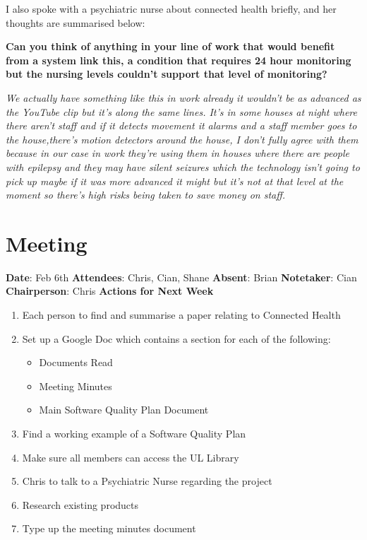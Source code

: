 I also spoke with a psychiatric nurse about connected health briefly, and her thoughts are summarised below: 

\textbf{Can you think of anything in your line of work that would benefit from a system link this, a condition that requires 24 hour monitoring but the nursing levels couldn't support that level of monitoring?}

\textit{We actually have something like this in work already it wouldn't be as advanced as the YouTube clip but it's along the same lines. It's in some houses at night where there aren't staff and if it detects movement it alarms and a staff member goes to the house,there's motion detectors around the house, I don't fully agree with them because in our case in work they're using them in houses where there are people with epilepsy and they may have silent seizures which the technology isn't going to pick up maybe if it was more advanced it might but it's not at that level at the moment so there's high risks being taken to save money on staff. }


\section{Meeting}

\textbf{Date}: Feb 6th\newline
\textbf{Attendees}: Chris, Cian, Shane\newline
\textbf{Absent}: Brian\newline
\textbf{Notetaker}: Cian\newline
\textbf{Chairperson}: Chris\newline \newline
\textbf{Actions for Next Week}
\begin{enumerate}
\item Each person to find and summarise a paper relating to Connected Health
\item Set up a Google Doc which contains a section for each of the following:
\begin{itemize}
\item Documents Read
\item Meeting Minutes
\item Main Software Quality Plan Document
\end{itemize} 
\item Find a working example of a Software Quality Plan
\item Make sure all members can access the UL Library
\item Chris to talk to a Psychiatric Nurse regarding the project
\item Research existing products
\item Type up the meeting minutes document
\end{enumerate}

